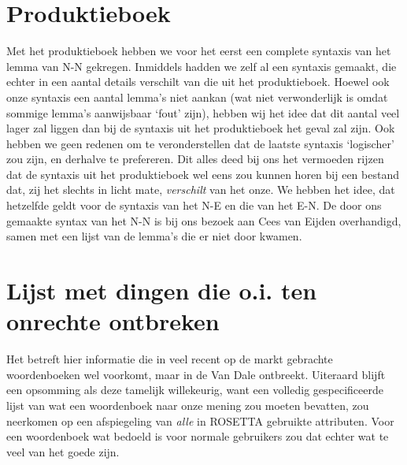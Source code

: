 \section{Produktieboek}
Met het produktieboek hebben we voor het eerst een complete syntaxis van het
lemma van N-N gekregen. Inmiddels hadden we zelf al een syntaxis gemaakt, die
echter in een aantal details verschilt van die uit het produktieboek. Hoewel
ook onze syntaxis een aantal lemma's niet aankan (wat niet verwonderlijk is
omdat sommige lemma's aanwijsbaar `fout' zijn), hebben wij het idee dat dit 
aantal veel lager zal liggen dan bij de syntaxis uit het produktieboek het
geval zal zijn. Ook hebben we geen redenen om te veronderstellen dat de laatste
syntaxis `logischer' zou zijn, en derhalve te prefereren. Dit alles deed bij 
ons het vermoeden rijzen dat de syntaxis uit het produktieboek wel eens zou 
kunnen horen bij een bestand dat, zij het slechts in licht mate,
{\em verschilt} van het onze. We hebben het
idee, dat hetzelfde geldt voor de syntaxis van het N-E en die van het E-N.
De door ons gemaakte syntax van het N-N is bij ons bezoek aan Cees van Eijden
overhandigd, samen met een lijst van de lemma's die er niet door kwamen.

\section{Lijst met dingen die o.i. ten onrechte ontbreken}

Het betreft hier informatie die in veel recent op de markt gebrachte 
woordenboeken wel voorkomt, maar in de Van Dale ontbreekt. Uiteraard blijft 
een opsomming
als deze tamelijk willekeurig, want een volledig gespecificeerde lijst van wat 
een woordenboek naar onze mening zou moeten bevatten, zou neerkomen op een 
afspiegeling van {\em alle} in ROSETTA gebruikte attributen. Voor een
woordenboek wat bedoeld is voor normale gebruikers zou dat echter wat te veel
van het goede zijn.

